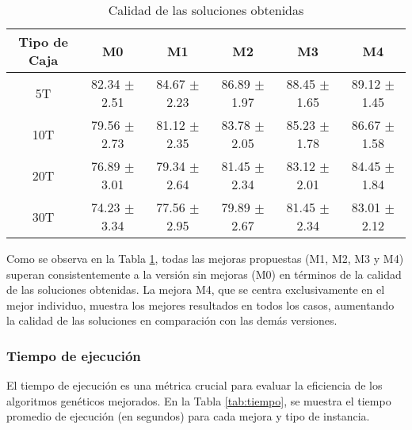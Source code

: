 \begin{table}[H]
    \centering
    \caption{Calidad de las soluciones obtenidas}
    \label{tab:calidad}
    \begin{tabular}{|c|c|c|c|c|c|}
        \hline
        \textbf{Tipo de Caja} & \textbf{M0}      & \textbf{M1}      & \textbf{M2}      & \textbf{M3}      & \textbf{M4}      \\ \hline
        5T                    & 82.34 $\pm$ 2.51 & 84.67 $\pm$ 2.23 & 86.89 $\pm$ 1.97 & 88.45 $\pm$ 1.65 & 89.12 $\pm$ 1.45 \\ \hline
        10T                   & 79.56 $\pm$ 2.73 & 81.12 $\pm$ 2.35 & 83.78 $\pm$ 2.05 & 85.23 $\pm$ 1.78 & 86.67 $\pm$ 1.58 \\ \hline
        20T                   & 76.89 $\pm$ 3.01 & 79.34 $\pm$ 2.64 & 81.45 $\pm$ 2.34 & 83.12 $\pm$ 2.01 & 84.45 $\pm$ 1.84 \\ \hline
        30T                   & 74.23 $\pm$ 3.34 & 77.56 $\pm$ 2.95 & 79.89 $\pm$ 2.67 & 81.45 $\pm$ 2.34 & 83.01 $\pm$ 2.12 \\ \hline
    \end{tabular}
\end{table}

Como se observa en la Tabla \ref{tab:calidad}, todas las mejoras propuestas (M1, M2, M3 y M4) superan consistentemente a la versión sin mejoras (M0) en términos de la calidad de las soluciones obtenidas. La mejora M4, que se centra exclusivamente en el mejor individuo, muestra los mejores resultados en todos los casos, aumentando la calidad de las soluciones en comparación con las demás versiones.

\subsubsection{Tiempo de ejecución}

El tiempo de ejecución es una métrica crucial para evaluar la eficiencia de los algoritmos genéticos mejorados. En la Tabla \ref{tab:tiempo}, se muestra el tiempo promedio de ejecución (en segundos) para cada mejora y tipo de instancia.

